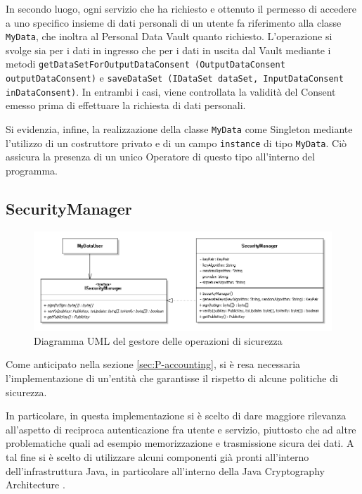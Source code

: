 In secondo luogo, ogni servizio che ha richiesto e ottenuto il permesso di accedere a uno specifico insieme di dati personali di un utente fa riferimento alla classe \texttt{MyData}, che inoltra al Personal Data Vault quanto richiesto. L’operazione si svolge sia per i dati in ingresso che per i dati in uscita dal Vault mediante i metodi \texttt{getDataSetForOutputDataConsent (OutputDataConsent outputDataConsent)} e \texttt{saveDataSet (IDataSet dataSet, InputDataConsent inDataConsent)}. In entrambi i casi, viene controllata la validit\`a del Consent emesso prima di effettuare la richiesta di dati personali.

Si evidenzia, infine, la realizzazione della classe \texttt{MyData} come Singleton mediante l’utilizzo di un costruttore privato e di un campo \texttt{instance} di tipo \texttt{MyData}. Ci\`o assicura la presenza di un unico Operatore di questo tipo all’interno del programma.

\subsection{SecurityManager}
\label{subsec:P-SecMan}
\begin{figure} [h]
	\includegraphics[width=\linewidth]{pictures/Accounting-SecurityManager.png}
	\caption{Diagramma UML del gestore delle operazioni di sicurezza}
	\label{fig:Accounting-SecurityManager}
\end{figure}
Come anticipato nella sezione \ref{sec:P-accounting}, si \`e resa necessaria l'implementazione di un'entit\`a che garantisse il rispetto di alcune politiche di sicurezza.

In particolare, in questa implementazione si \`e scelto di dare maggiore rilevanza all'aspetto di reciproca autenticazione fra utente e servizio, piuttosto che ad altre problematiche quali ad esempio memorizzazione e trasmissione sicura dei dati. A tal fine si \`e scelto di utilizzare alcuni componenti gi\`a pronti all'interno dell'infrastruttura Java, in particolare all'interno della Java Cryptography Architecture \cite{javacrypto}.

